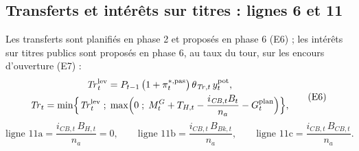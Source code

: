 \documentclass[11pt,a4paper]{article}
\begin{document}
\subsection{Transferts et intérêts sur titres : lignes 6 et 11}
\label{sec:finances_publiques-transferts}
\begin{proposee}
Les transferts sont planifiés en phase 2 et proposés en phase 6 (E6) ; les intérêts sur titres publics sont proposés en phase 6, au taux du tour, sur les encours d'ouverture (E7) :
\begin{equation*}
\begin{gathered}
\mathit{Tr}^{\mathrm{lev}}_t = P_{t-1}\,\bigl(1 + \pi^{\ast,\mathrm{pas}}_t\bigr)\,\theta_{\mathit{Tr},t}\,y^{\mathrm{pot}}_t, \\
\mathit{Tr}_t = \min\Bigl\{\mathit{Tr}^{\mathrm{lev}}_t \;;\; \max\Bigl(0 \;;\; M^G_t + T_{H,t} - \frac{i_{\mathit{CB},t} B_t}{n_a} - G^{\mathrm{plan}}_t\Bigr)\Bigr\} ,
\end{gathered} \tag{E6}
\end{equation*}
\begin{equation*}
\text{ligne 11a} = \frac{i_{\mathit{CB},t}\,B_{H,t}}{n_a} = 0, \qquad \text{ligne 11b} = \frac{i_{\mathit{CB},t}\,B_{\mathit{Bk},t}}{n_a}, \qquad \text{ligne 11c} = \frac{i_{\mathit{CB},t}\,B_{\mathit{CB},t}}{n_a} . \tag{E7}
\end{equation*}


\end{proposee}
\end{document}

